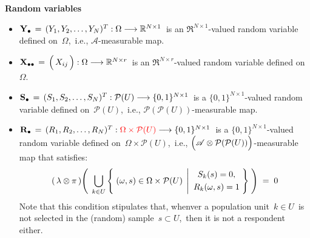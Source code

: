 \vskip 0.2cm
\noindent
\textbf{Random variables}
\begin{itemize}
\item
    $\mathbf{Y}_{\bullet} \,=\, (Y_{1},Y_{2},\ldots,Y_{N})^{T} : \Omega \longrightarrow \mathbb{R}^{N \times 1}$\,
    is an $\Re^{N \times 1}$-valued random variable defined on \,$\Omega$,\,
    i.e., $\mathscr{A}$-measurable map.
\item
    $\Xdotdot\,=\,\left(\,\overset{{\color{white}.}}{X_{ij}}\,\right) : \Omega \longrightarrow \Re^{N \times r}$\,
    is an $\Re^{N \times r}$-valued random variable defined on \,$\Omega$.
\item
    $\mathbf{S}_{\bullet} \,=\, (S_{1},S_{2},\ldots,S_{N})^{T} : \mathcal{P}(U) \longrightarrow \{0,1\}^{N \times 1}$\,
    is a $\{0,1\}^{N \times 1}$-valued random variable defined on \,$\mathcal{P}(U)$,\,
    i.e., $\mathcal{P}(\mathcal{P}(U))$-measurable map.
\item
    $\mathbf{R}_{\bullet} \,=\, (R_{1},R_{2},\ldots,R_{N})^{T} : {\color{red}\Omega \times \mathcal{P}(U)} \longrightarrow \{0,1\}^{N \times 1}$\,
    is a $\{0,1\}^{N \times 1}$-valued random variable defined on \,$\Omega \times \mathcal{P}(U)$,\,
    i.e., $\left(\mathscr{A} \overset{{\color{white}.}}{\otimes} \mathcal{P}(\mathcal{P}(U))\right)$-measurable map
    that satisfies:
    \begin{equation*}
    (\,\lambda\otimes\pi\,)\!\left(\;\,
        \underset{k \in U}{\bigcup}\left\{\;
            (\omega,s) \in \Omega\times\mathcal{P}(U)
            \;\left\vert
            \begin{array}{c}
            S_{k}(s) = 0, %
            \\
            \overset{{\color{white}.}}{R_{k}(\omega,s) = 1}
            \end{array}
            \right.
            \!\!\right\}
        \;\right)
    \; = \;
        0
    \end{equation*}
    Note that this condition stipulates that,
    whenver a population unit \,$k \in U$\, is not selected in the (random) sample \,$s \subset U$,\,
    then it is not a respondent either.
\end{itemize}

